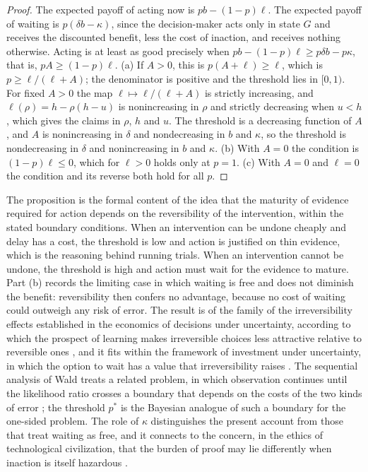 \documentclass[11pt,twoside,openright]{book}
\theoremstyle{plain}
\theoremstyle{definition}
\theoremstyle{remark}
\begin{document}
\begin{proof}
The expected payoff of acting now is $pb-(1-p)\ell$. The expected payoff of waiting is $p(\delta b-\kappa)$, since the decision-maker acts only in state $G$ and receives the discounted benefit, less the cost of inaction, and receives nothing otherwise. Acting is at least as good precisely when $pb-(1-p)\ell\ge p\delta b-p\kappa$, that is, $pA\ge(1-p)\ell$. (a) If $A>0$, this is $p(A+\ell)\ge\ell$, which is $p\ge\ell/(\ell+A)$; the denominator is positive and the threshold lies in $[0,1)$. For fixed $A>0$ the map $\ell\mapsto\ell/(\ell+A)$ is strictly increasing, and $\ell(\rho)=h-\rho(h-u)$ is nonincreasing in $\rho$ and strictly decreasing when $u<h$, which gives the claims in $\rho$, $h$ and $u$. The threshold is a decreasing function of $A$, and $A$ is nonincreasing in $\delta$ and nondecreasing in $b$ and $\kappa$, so the threshold is nondecreasing in $\delta$ and nonincreasing in $b$ and $\kappa$. (b) With $A=0$ the condition is $(1-p)\ell\le0$, which for $\ell>0$ holds only at $p=1$. (c) With $A=0$ and $\ell=0$ the condition and its reverse both hold for all $p$.
\end{proof}

The proposition is the formal content of the idea that the maturity of evidence required for action depends on the reversibility of the intervention, within the stated boundary conditions. When an intervention can be undone cheaply and delay has a cost, the threshold is low and action is justified on thin evidence, which is the reasoning behind running trials. When an intervention cannot be undone, the threshold is high and action must wait for the evidence to mature. Part (b) records the limiting case in which waiting is free and does not diminish the benefit: reversibility then confers no advantage, because no cost of waiting could outweigh any risk of error. The result is of the family of the irreversibility effects established in the economics of decisions under uncertainty, according to which the prospect of learning makes irreversible choices less attractive relative to reversible ones \cite{arrowfisher1974,henry1974}, and it fits within the framework of investment under uncertainty, in which the option to wait has a value that irreversibility raises \cite{dixitpindyck1994}. The sequential analysis of Wald treats a related problem, in which observation continues until the likelihood ratio crosses a boundary that depends on the costs of the two kinds of error \cite{wald1945}; the threshold $p^*$ is the Bayesian analogue of such a boundary for the one-sided problem. The role of $\kappa$ distinguishes the present account from those that treat waiting as free, and it connects to the concern, in the ethics of technological civilization, that the burden of proof may lie differently when inaction is itself hazardous \cite{jonas1984}.
\end{document}
